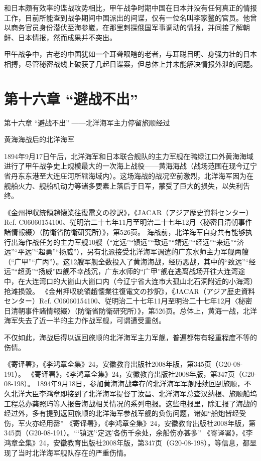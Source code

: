 \documentclass[12pt,UTF8]{ctexbook}
\begin{document}
和日本颇有效率的谍战攻势相比，甲午战争时期中国在日本并没有任何真正的情报工作，目前所能查到战争期间中国派出的间谍，仅有一位名叫李家鳌的官员。他曾以商务官员身份潜伏至海参崴，在那里刺探俄国军事调动的情报，并间接了解朝鲜、日本情报，然而成果并不突出。

甲午战争中，古老的中国犹如一个耳聋眼瞎的老者，与耳聪目明、身强力壮的日本相搏，尽管秘密战线上破获了几起日谍案，但总体上并未能解决情报外泄的问题。

\chapter{第十六章 “避战不出”}

第十六章
“避战不出”
——北洋海军主力停留旅顺经过

黄海海战后的北洋海军

1894年9月17日午后，北洋海军和日本联合舰队的主力军舰在鸭绿江口外黄海海域进行了甲午战争史上规模最大的一次海上战役——黄海海战（战场范围在现今辽宁省丹东东港至大连庄河所辖海域内）。这场海战的战况空前激烈，北洋海军因为在舰船火力、舰船机动力等诸多要素上落后于日军，蒙受了巨大的损失，以失利告终。

《金州押収統領趙懐業往復電文の抄訳》，《JACAR（アジア歴史資料センター）Ref. C06060154100、従明治二十七年11月至明治二十七年12月〈秘密日清朝事件諸情報綴〉（防衛省防衛研究所）》，第526页。
海战前，北洋海军自身共有能够执行出海作战任务的主力军舰10艘（“定远”“镇远”“致远”“靖远”“经远”“来远”“济远”“平远”“超勇”“扬威”），另有北派接受北洋海军调遣的广东水师主力军舰两艘（“广甲”“广丙”）。这12艘军舰全数投入了黄海海战，经历恶战，其中的“致远”“经远”“超勇”“扬威”四舰不幸战沉，广东水师的“广甲”舰在逃离战场开往大连湾途中，在大连湾口的大崮山大崮口内（今辽宁省大连市大孤山北石洞附近的小海湾）抢滩损毁。 《金州押収統領趙懐業往復電文の抄訳》，《JACAR（アジア歴史資料センター）Ref. C06060154100、従明治二十七年11月至明治二十七年12月〈秘密日清朝事件諸情報綴〉（防衛省防衛研究所）》，第526页。总体上，黄海一战，北洋海军失去了近一半的主力作战军舰，可谓遭受重创。

不仅如此，海战后得以返回旅顺的北洋海军主力军舰，普遍都带有轻重程度不等的伤情。

《寄译署》，《李鸿章全集》24，安徽教育出版社2008年版，第345页（G20-08-191）。
《寄译署》，《李鸿章全集》24，安徽教育出版社2008年版，第347页（G20-08-198）。
1894年9月18日，参加黄海海战幸存的北洋海军军舰陆续回到旅顺，不久北洋大臣李鸿章即接到了北洋海军提督丁汝昌、北洋海军总查汉纳根、旅顺船坞工程总办龚照玙等人报告海战相关情况的系列电报。这些电报里，除汇报了海战的经过外，多有提到返回旅顺的北洋海军参战军舰的负伤问题，诸如“船炮皆经受伤，军火亦经用罄” 《寄译署》，《李鸿章全集》24，安徽教育出版社2008年版，第345页（G20-08-191）。“‘镇远’‘定远’各伤千余处，余船伤亦甚多” 《寄译署》，《李鸿章全集》24，安徽教育出版社2008年版，第347页（G20-08-198）。等信息，都显现了当时北洋海军舰队存在的严重伤情。
\end{document}
